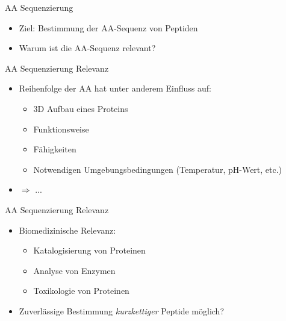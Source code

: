 \documentclass{beamer}
\newcommand{\dashAndSpace}{\textendash \space}
\begin{document}
        \begin{frame}{AA Sequenzierung}
        \begin{itemize}
        \item<1-> Ziel: Bestimmung der AA-Sequenz von Peptiden
        \vspace*{0.5cm}
        \item<3-> Warum ist die AA-Sequenz relevant?
        \end{itemize}
        \end{frame}


        \begin{frame}{AA Sequenzierung \dashAndSpace Relevanz}
        \begin{itemize}
        \item<1-> Reihenfolge der AA hat unter anderem Einfluss auf:
        \begin{itemize}
         \item<2-> 3D Aufbau eines Proteins
         \item<2-> Funktionsweise
         \item<2-> Fähigkeiten
         \item<2-> Notwendigen Umgebungsbedingungen (Temperatur, pH-Wert, etc.)
        \end{itemize}
        \item<3-> $\Rightarrow$ ...
        \end{itemize}
        \end{frame}



        \begin{frame}{AA Sequenzierung \dashAndSpace Relevanz}
        \begin{itemize}
        \item<1-> Biomedizinische Relevanz:
        \begin{itemize}
         \item<1-> Katalogisierung von Proteinen
         \item<1-> Analyse von Enzymen
         \item<1-> Toxikologie von Proteinen
        \end{itemize}
        \vspace*{0.5cm}
        \item<2-> Zuverlässige Bestimmung \emph{kurzkettiger} Peptide möglich?
        \end{itemize}
        \end{frame}
\end{document}
